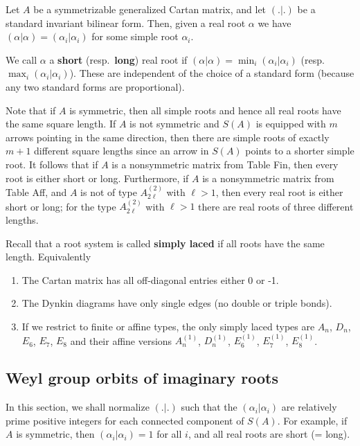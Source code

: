 \documentclass[12pt]{article}
\begin{document}
Let $A$ be a symmetrizable generalized Cartan matrix, and let $(.|.)$ be a
standard invariant bilinear form. Then, given a real root $\alpha$ we
have $(\alpha|\alpha) = (\alpha_i|\alpha_i)$ for some simple root $\alpha_i$.

\begin{definition}
    We call $\alpha$ a \textbf{short} (resp.\ \textbf{long}) real root if
    $(\alpha|\alpha) = \min_i(\alpha_i|\alpha_i)$ (resp.\
    $\max_i(\alpha_i|\alpha_i)$). These are independent of the choice of a standard
    form (because any two standard forms are proportional).
\end{definition}
Note that if $A$ is symmetric, then all simple roots and hence all real
roots have the same square length. If $A$ is not symmetric and $S(A)$ is equipped
with $m$ arrows pointing in the same direction, then there are simple roots of
exactly $m+1$ different square lengths since an arrow in $S(A)$ points to a
shorter simple root. It follows that if $A$ is a nonsymmetric matrix from Table
Fin, then every root is either short or long. Furthermore, if $A$ is a nonsymmetric  matrix from Table Aff, and $A$ is not of type $A_{2\ell}^{(2)}$ with $\ell > 1$, then every real root is either short or long; for the type $A_{2\ell}^{(2)}$ with
$\ell > 1$ there are real roots of three different lengths.

\begin{remark}
    Recall that a root system is called \textbf{simply laced} if all roots have the same length. Equivalently \begin{enumerate}
        \item The Cartan matrix has all off-diagonal entries either 0 or -1.
        \item The Dynkin diagrams have only single edges (no double or triple bonds).
        \item If we restrict to finite or affine types, the only simply laced types are $A_n$, $D_n$, $E_6$, $E_7$, $E_8$ and their affine versions $A_n^{(1)}$, $D_n^{(1)}$, $E_6^{(1)}$, $E_7^{(1)}$, $E_8^{(1)}$.
    \end{enumerate}
\end{remark}

\subsection{Weyl group orbits of imaginary roots}
In this section, we shall normalize $(.|.)$ such that the $(\alpha_i|\alpha_i)$
are relatively prime positive integers for each connected component of $S(A)$.
For example, if $A$ is symmetric, then $(\alpha_i|\alpha_i)=1$ for all $i$, and
all real roots are short (= long).
\end{document}

